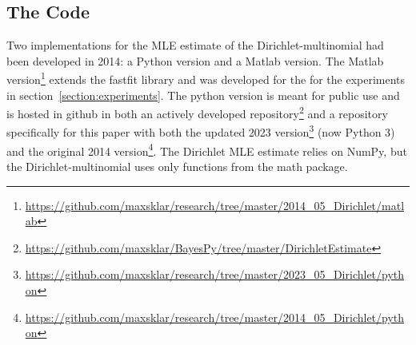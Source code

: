 \documentclass[twoside]{article}
\begin{document}
\subsection{The Code}
\label{code}

Two implementations for the MLE estimate of the Dirichlet-multinomial had been developed in 2014: a Python version and a Matlab version. The Matlab version\footnote{\url{https://github.com/maxsklar/research/tree/master/2014\_05\_Dirichlet/matlab}} extends the fastfit library and was developed for the for the experiments in section~\ref{section:experiments}. The python version is meant for public use and is hosted in github in both an actively developed repository\footnote{\url{https://github.com/maxsklar/BayesPy/tree/master/DirichletEstimate}} and a repository specifically for this paper with both the updated 2023 version\footnote{\url{https://github.com/maxsklar/research/tree/master/2023\_05\_Dirichlet/python}} (now Python 3) and the original 2014 version\footnote{\url{https://github.com/maxsklar/research/tree/master/2014\_05\_Dirichlet/python}}. The Dirichlet MLE estimate relies on NumPy, but the Dirichlet-multinomial uses only functions from the math package. 

\end{document}
